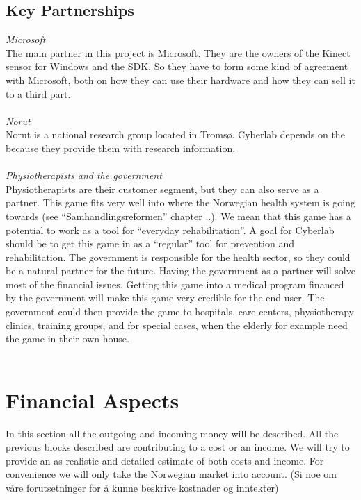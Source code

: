 \subsection{Key Partnerships}
\emph{Microsoft} \\
The main partner in this project is Microsoft. They are the owners of the Kinect sensor for Windows and the SDK. So they have to form some kind of agreement with Microsoft, both on how they can use their hardware and how they can sell it to a third part. \\ \\ 
\emph{Norut} \\
Norut is a national research group located in Tromsø. Cyberlab depends on the because they provide them with research information.  \\ \\ 
\emph{Physiotherapists and the government}\\
Physiotherapists are their customer segment, but they can also serve as a partner. This game fits very well into where the Norwegian health system is going towards (see “Samhandlingsreformen” chapter ..). We mean that this game has a potential to work as a tool for “everyday rehabilitation”. A goal for Cyberlab should be to get this game in as a “regular” tool for prevention and rehabilitation. The government is responsible for the health sector, so they could be a natural partner for the future. Having the government as a partner will solve most of the financial issues. Getting this game into a medical program financed by the government will make this game very credible for the end user. The government could then provide the game to hospitals, care centers, physiotherapy clinics, training groups, and for special cases, when the elderly for example need the game in their own house. \\ \\ 

\section{Financial Aspects}
In this section all the outgoing and incoming money will be described. All the previous blocks described are contributing to a cost or an income. We will try to provide an as realistic and detailed estimate of both costs and income. For convenience we will only take the Norwegian market into account. (Si noe om v{å}re forutsetninger for {å} kunne beskrive kostnader og inntekter)


